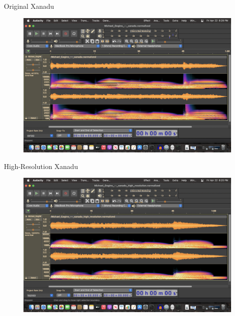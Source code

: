 \documentclass{beamer}
\begin{document}
\begin{frame}{Original Xanadu}
\begin{figure}
\centerline{\includegraphics[height = 0.66\textwidth]{xanadu}}
\end{figure}
\end{frame}

\begin{frame}{High-Resolution Xanadu}
\begin{figure}
\centerline{\includegraphics[height = 0.66\textwidth]{xanadu-high-resolution}}
\end{figure}
\end{frame}
\end{document}
